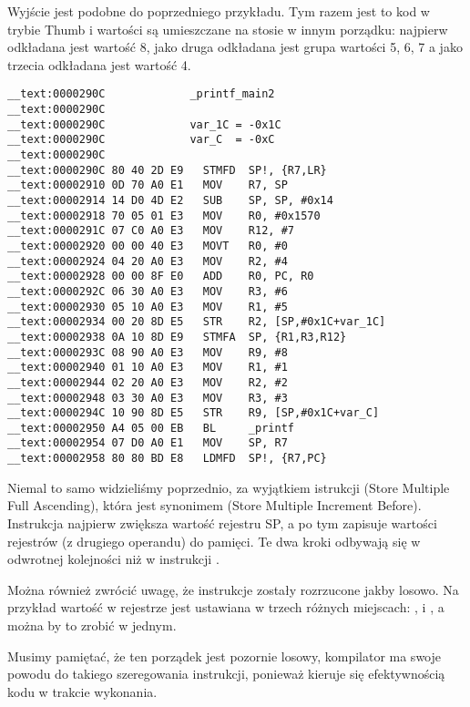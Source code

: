 

Wyjście jest podobne do poprzedniego przykładu. Tym razem jest to kod w trybie Thumb i wartości są umieszczane na stosie w innym porządku:
najpierw odkładana jest wartość 8, jako druga odkładana jest grupa wartości 5, 6, 7 a jako trzecia odkładana jest wartość 4.

\myparagraph{\OptimizingXcodeIV: \ARMMode}

\begin{lstlisting}[style=customasmARM]
__text:0000290C             _printf_main2
__text:0000290C
__text:0000290C             var_1C = -0x1C
__text:0000290C             var_C  = -0xC
__text:0000290C
__text:0000290C 80 40 2D E9   STMFD  SP!, {R7,LR}
__text:00002910 0D 70 A0 E1   MOV    R7, SP
__text:00002914 14 D0 4D E2   SUB    SP, SP, #0x14
__text:00002918 70 05 01 E3   MOV    R0, #0x1570
__text:0000291C 07 C0 A0 E3   MOV    R12, #7
__text:00002920 00 00 40 E3   MOVT   R0, #0
__text:00002924 04 20 A0 E3   MOV    R2, #4
__text:00002928 00 00 8F E0   ADD    R0, PC, R0
__text:0000292C 06 30 A0 E3   MOV    R3, #6
__text:00002930 05 10 A0 E3   MOV    R1, #5
__text:00002934 00 20 8D E5   STR    R2, [SP,#0x1C+var_1C]
__text:00002938 0A 10 8D E9   STMFA  SP, {R1,R3,R12}
__text:0000293C 08 90 A0 E3   MOV    R9, #8
__text:00002940 01 10 A0 E3   MOV    R1, #1
__text:00002944 02 20 A0 E3   MOV    R2, #2
__text:00002948 03 30 A0 E3   MOV    R3, #3
__text:0000294C 10 90 8D E5   STR    R9, [SP,#0x1C+var_C]
__text:00002950 A4 05 00 EB   BL     _printf
__text:00002954 07 D0 A0 E1   MOV    SP, R7
__text:00002958 80 80 BD E8   LDMFD  SP!, {R7,PC}
\end{lstlisting}

Niemal to samo widzieliśmy poprzednio, za wyjątkiem istrukcji  (Store Multiple Full Ascending), która jest synonimem  (Store Multiple Increment Before).
Instrukcja najpierw zwiększa wartość rejestru \ac{SP}, a po tym zapisuje wartości rejestrów (z drugiego operandu) do pamięci. Te dwa kroki odbywają się w odwrotnej kolejności niż w instrukcji .

Można również zwrócić uwagę, że instrukcje zostały rozrzucone jakby losowo. Na przykład wartość w rejestrze  jest ustawiana w trzech różnych miejscach: ,  i , a można by to zrobić w jednym.

Musimy pamiętać, że ten porządek jest pozornie losowy, kompilator ma swoje powodu do takiego szeregowania instrukcji, ponieważ kieruje się efektywnością kodu w trakcie wykonania.

